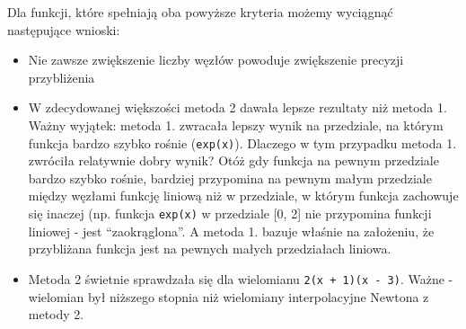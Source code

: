 \documentclass[a4paper,10pt]{article}
\begin{document}
   Dla funkcji, które spełniają oba powyższe kryteria możemy wyciągnąć następujące wnioski:
   \begin{itemize}
    \item Nie zawsze zwiększenie liczby węzłów powoduje zwiększenie precyzji przybliżenia
    \item W zdecydowanej większości metoda 2 dawała lepsze rezultaty niż metoda 1. Ważny wyjątek:
    metoda 1. zwracała lepszy wynik na przedziale, na którym funkcja bardzo szybko rośnie
    (\texttt{exp(x)}). Dlaczego w tym przypadku metoda 1. zwróciła relatywnie dobry wynik? Otóż
    gdy funkcja na pewnym przedziale bardzo szybko rośnie, bardziej przypomina na pewnym małym
    przedziale między węzłami funkcję liniową niż w przedziale, w którym funkcja zachowuje się inaczej
    (np. funkcja \texttt{exp(x)} w przedziale [0, 2] nie przypomina funkcji liniowej - jest 
    \textquotedblleft zaokrąglona\textquotedblright. A metoda 1. bazuje właśnie na założeniu,
    że przybliżana funkcja jest na pewnych małych przedziałach liniowa.
    \item Metoda 2 świetnie sprawdzała się dla wielomianu \texttt{2(x + 1)(x - 3)}. Ważne - wielomian był
    niższego stopnia niż wielomiany interpolacyjne Newtona z metody 2.
    
   \end{itemize}


   
\end{document}
